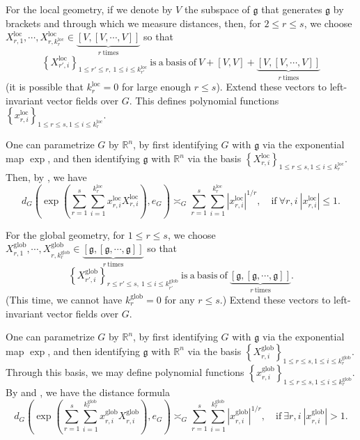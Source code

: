 \documentclass[11pt,reqno]{amsart}
\newcommand{\1}{\mathbf 1}
\begin{document}
For the local geometry, if we denote by $V$ the subspace of $\mathfrak{g}$ that generates $\mathfrak{g}$ by brackets and through which we measure distances, then, for $2\le r\le s$, we choose $X^{\mathrm{loc}}_{r,1},\cdots, X^{\mathrm{loc}}_{r,k^{\mathrm{loc}}_r}\in \underbrace{\left[V,\left[V,\cdots,V\right]\right]}_{r~\mathrm{times}}$ so that
\[
\left\{X_{r',i}^{\mathrm{loc}}\right\}_{1\le r'\le r,~1\le i\le k_{r'}^{\mathrm{loc}}} \mathrm{~is~a~basis~of~}V+\left[V,V\right]+\underbrace{\left[V,\left[V,\cdots,V\right]\right]}_{r~\mathrm{times}}
\]
(it is possible that $k_r^{\mathrm{loc}}=0$ for large enough $r\le s$). Extend these vectors to left-invariant vector fields over $G$. This defines polynomial functions $\left\{x^{\mathrm{loc}}_{r,i}\right\}_{1\le r\le s,1\le i\le k_r^{\mathrm{loc}}}$.


One can parametrize $G$ by $\mathbb{R}^n$, by first identifying $G$ with $\mathfrak{g}$ via the exponential map $\exp$, and then identifying $\mathfrak{g}$ with $\mathbb{R}^n$ via the basis $\left\{X^{\mathrm{loc}}_{r,i}\right\}_{1\le r\le s,1\le i\le k_r^{\mathrm{loc}}}$. Then, by \cite[Lemma 2.1]{jean2014control}, we have
\[
d_G\left(\exp\left(\sum_{r=1}^s\sum_{i=1}^{k^{\mathrm{loc}}_r}x^{\mathrm{loc}}_{r,i} X^{\mathrm{loc}}_{r,i}\right),e_G\right)\asymp_G \sum_{r=1}^s\sum_{i=1}^{k^{\mathrm{loc}}_r}\left|x^{\mathrm{loc}}_{r,i}\right|^{1/r},\quad \mathrm{if~}\forall r,i~\left|x^{\mathrm{loc}}_{r,i}\right|\le 1.
\]


For the global geometry, for $1\le r\le s$, we choose $X^{\mathrm{glob}}_{r,1},\cdots, X^{\mathrm{glob}}_{r,k^{\mathrm{glob}}_r}\in \underbrace{\left[\mathfrak{g},\left[\mathfrak{g},\cdots,\mathfrak{g}\right]\right]}_{r~\mathrm{times}}$ so that
\[
\left\{X_{r',i}^{\mathrm{glob}}\right\}_{r\le r'\le s,~1\le i\le k_{r'}^{\mathrm{glob}}}\mathrm{~is~a~basis~of~}\underbrace{\left[\mathfrak{g},\left[\mathfrak{g},\cdots,\mathfrak{g}\right]\right]}_{r~\mathrm{times}}.
\]
(This time, we cannot have $k_r^{\mathrm{glob}}=0$ for any $r\le s$.) Extend these vectors to left-invariant vector fields over $G$.


One can parametrize $G$ by $\mathbb{R}^n$, by first identifying $G$ with $\mathfrak{g}$ via the exponential map $\exp$, and then identifying $\mathfrak{g}$ with $\mathbb{R}^n$ via the basis $\left\{X^{\mathrm{glob}}_{r,i}\right\}_{1\le r\le s,1\le i\le k_r^{\mathrm{glob}}}$. Through this basis, we may define polynomial functions $\left\{x^{\mathrm{glob}}_{r,i}\right\}_{1\le r\le s,1\le i\le k_r^{\mathrm{glob}}}$. By \cite[Proposition 2.13]{breuillard2012nilpotent} and \cite{pansu1983croissance}, we have the distance formula
\[
d_G\left(\exp\left(\sum_{r=1}^s\sum_{i=1}^{k^{\mathrm{glob}}_r}x^{\mathrm{glob}}_{r,i} X^{\mathrm{glob}}_{r,i}\right),e_G\right)\asymp_G \sum_{r=1}^s\sum_{i=1}^{k^{\mathrm{glob}}_r}\left|x^{\mathrm{glob}}_{r,i}\right|^{1/r},\quad \mathrm{if~}\exists r,i~\left|x^{\mathrm{glob}}_{r,i}\right|> 1.
\]
\end{document}
